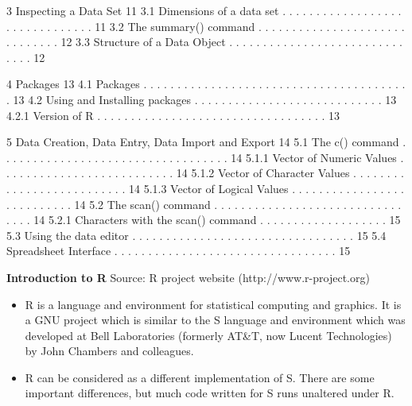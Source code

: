 \documentclass{beamer}
\begin{document}
	\begin{frame}
		3 Inspecting a Data Set 11
		3.1 Dimensions of a data set . . . . . . . . . . . . . . . . . . . . . . . . . . . . . . . 11
		3.2 The summary() command . . . . . . . . . . . . . . . . . . . . . . . . . . . . . . 12
		3.3 Structure of a Data Object . . . . . . . . . . . . . . . . . . . . . . . . . . . . . . 12
	\end{frame}
	\begin{frame}
		4 Packages 13
		4.1 Packages . . . . . . . . . . . . . . . . . . . . . . . . . . . . . . . . . . . . . . . . 13
		4.2 Using and Installing packages . . . . . . . . . . . . . . . . . . . . . . . . . . . . 13
		4.2.1 Version of R . . . . . . . . . . . . . . . . . . . . . . . . . . . . . . . . . . 13
	\end{frame}
	\begin{frame}
		5 Data Creation, Data Entry, Data Import and Export 14
		5.1 The c() command . . . . . . . . . . . . . . . . . . . . . . . . . . . . . . . . . . 14
		5.1.1 Vector of Numeric Values . . . . . . . . . . . . . . . . . . . . . . . . . . 14
		5.1.2 Vector of Character Values . . . . . . . . . . . . . . . . . . . . . . . . . . 14
		5.1.3 Vector of Logical Values . . . . . . . . . . . . . . . . . . . . . . . . . . . 14
		5.2 The scan() command . . . . . . . . . . . . . . . . . . . . . . . . . . . . . . . . 14
		5.2.1 Characters with the scan() command . . . . . . . . . . . . . . . . . . . 15
		5.3 Using the data editor . . . . . . . . . . . . . . . . . . . . . . . . . . . . . . . . . 15
		5.4 Spreadsheet Interface . . . . . . . . . . . . . . . . . . . . . . . . . . . . . . . . . 15
		
	\end{frame}
	\begin{frame}
		
		\textbf{Introduction to R}
		Source: R project website (http://www.r-project.org)
		\begin{itemize}
			\item R is a language and environment for statistical computing and graphics. It is a GNU project
			which is similar to the S language and environment which was developed at Bell Laboratories
			(formerly AT\&T, now Lucent Technologies) by John Chambers and colleagues. 
			\item R can be considered
			as a different implementation of S. There are some important differences, but much
			code written for S runs unaltered under R.
		\end{itemize}
		
	\end{frame}
\end{document}
